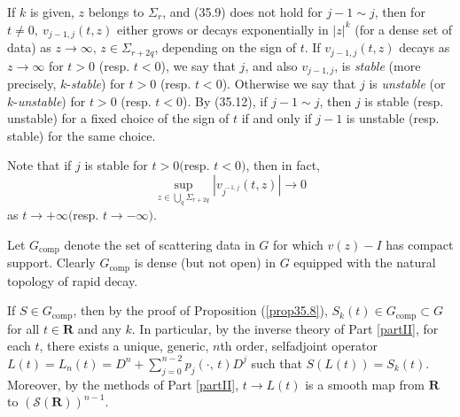 \documentclass{surv-l}
\theoremstyle{plain}
\theoremstyle{definition}
\numberwithin{equation}{chapter}
\begin{document}
If $k$ is given, $z$ belongs to $\Sigma_{r}$, and (35.9) does not hold for $j-1\sim j$, then for $t\neq 0,\ v_{j-1,j}(t, z)$ either grows or decays exponentially in $|z|^{k}$ (for a dense set of data) as $z\rightarrow\infty,\, z\in\Sigma_{r+2q}$, depending on the sign of $t$. If $v_{j-1,j}(t, z)$ decays as $ z\rightarrow\infty$ for $t>0$ (resp. $t<0$), we say that $j$, and also $v_{j-1,j}$, is \emph{stable} (more precisely, $k$-\emph{stable}) for $t>0$ (resp. $t<0$). Otherwise we say that $j$ is \emph{unstable} (or $k$-\emph{unstable}) for $t>0$ (resp. $t<0$). By (35.12), if $j-1\sim j$, then $j$ is stable (resp. unstable) for a fixed choice of the sign of $t$ if and only if $j-1$ is unstable (resp. stable) for the same choice.

Note that if $j$ is stable for $t>0 ($resp. $t<0)$, then in fact,
\setcounter{equation}{17}
\begin{equation}\label{eq35.18}
\sup_{z\in\bigcup_{q}\Sigma_{r+2q}}|v_{j^{-1,j}}(t,z)|\rightarrow 0
\end{equation}
as $ t\rightarrow+\infty ($resp. $t\rightarrow-\infty)$.

Let $G_{\mathrm{comp}}$ denote the set of scattering data in $G$ for which $v(z)-I$ has compact support. Clearly $G_{\mathrm{comp}}$ is dense (but not open) in $G$ equipped with the natural topology of rapid decay.

If $S\in G_{\mathrm{comp}}$, then by the proof of Proposition (\ref{prop35.8}), $S_{k}(t)\in G_{\mathrm{comp}}\subset G$ for all $t\in \mathbf{R}$ and any $k$. In particular, by the inverse theory of Part \ref{partII}, for each $t$, there exists a unique, generic, $n$th order, selfadjoint operator $L(t)=L_{n}(t)= D^{n}+\sum_{j=0}^{n-2}p_{j}(\cdot,\, t)D^{j}$ such that $S(L(t))=S_{k}(t)$. Moreover, by the methods of Part \ref{partII}, $t\rightarrow L(t)$ is a smooth map from $\mathbf{R}$ to $(\mathscr{S}(\mathbf{R}))^{n-1}$.
\end{document}

